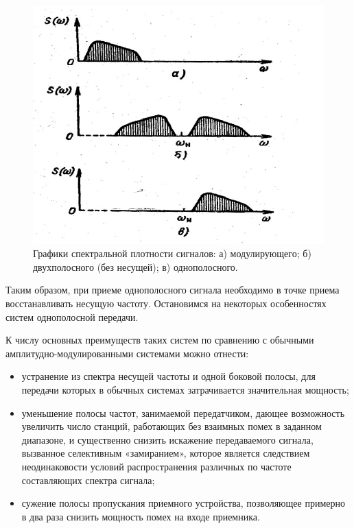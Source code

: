 \begin{figure}[h!]
	\centering
	\includegraphics[scale=1.5]{fig/fig4}
	\caption{ Графики спектральной плотности сигналов: а) модулирующего;
б) двухполосного (без несущей); в) однополосного.}
	\label{fig:fig4}
\end{figure}

Таким образом, при приеме однополосного сигнала необходимо в точке приема восстанавливать несущую частоту. Остановимся на некоторых особенностях систем однополосной передачи.

К числу основных преимуществ таких систем по сравнению с обычными
амплитудно-модулированными системами можно отнести:
\begin{itemize}
	\item устранение из спектра несущей частоты и одной боковой полосы, для
передачи которых в обычных системах затрачивается значительная мощность;
	\item уменьшение полосы частот, занимаемой передатчиком, дающее возможность увеличить число станций, работающих без взаимных помех в заданном диапазоне, и существенно снизить искажение передаваемого сигнала, вызванное селективным «замиранием», которое является следствием неодинаковости условий распространения различных по частоте составляющих
спектра сигнала;
	\item сужение полосы пропускания приемного устройства, позволяющее примерно в два раза снизить мощность помех на входе приемника. 
\end{itemize}

